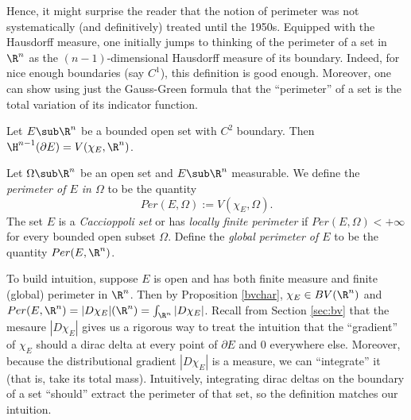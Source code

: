 \documentclass[../main.tex]{subfiles}
\begin{document}
Hence, it might surprise the reader that the notion of perimeter was not systematically (and definitively) treated until the 1950s. 
Equipped with the Hausdorff measure, one initially jumps to thinking of the perimeter of a set in $ \R^{n} $ as the $ (n-1) $-dimensional Hausdorff measure of its boundary. Indeed, for nice enough boundaries (say $ C^1 $), this definition is good enough. Moreover,  one can show using just the Gauss-Green formula that the ``perimeter'' of a set is the total variation of its indicator function.
\begin{factexercise}
    Let $ E\sub \R^{n} $ be a bounded open set with $ C^{2} $ boundary. Then $ \H^{n-1}(\partial E) = V(\chi_{E},\R^{n}) $.
\end{factexercise}



\begin{definition}
    Let $ \Omega\sub \R^{n} $ be an open set and $ E\sub \R^{n} $ measurable. We define the \textit{perimeter of $ E $ in $ \Omega $} to be the quantity
    \[
        Per(E,\Omega):= V( \chi_{E}, \Omega).
    \]
    The set $ E $ is a \textit{Caccioppoli set} or has \textit{locally finite perimeter} if $ Per(E,\Omega) <+\infty $ for every bounded open subset $ \Omega $. Define the \textit{global perimeter of $ E $} to be the quantity $ Per(E,\R^{n}) $.
\end{definition}


To build intuition, suppose $ E $ is open and has both finite measure and finite (global) perimeter in $ \R^{n} $. Then by Proposition \ref{bvchar}, $ \chi_{E}\in BV(\R^{n}) $ and $ Per(E,\R^{n}) = |D \chi_{E}|(\R^{n}) = \int_{\R^{n}}|D \chi_{E}|$. Recall from Section \ref{sec:bv} that the mesaure $ |D \chi_{E}| $ gives us a rigorous way to treat the intuition that the ``gradient'' of $ \chi_{E} $ should a dirac delta at every point of $ \partial E $ and $ 0 $ everywhere else. Moreover, because the distributional gradient $ |D \chi_{E}| $ is a measure, we can ``integrate'' it (that is, take its total mass). Intuitively, integrating dirac deltas on the boundary of a set ``should'' extract the perimeter of that set, so the definition matches our intuition.
\end{document}
